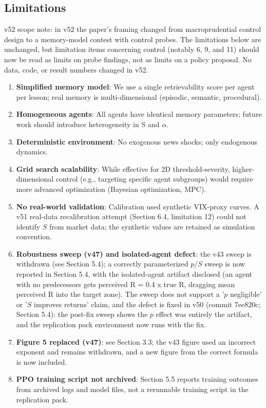 \documentclass[11pt]{article}
\begin{document}
\subsection{Limitations}
v52 scope note: in v52 the paper's framing changed from macroprudential control design to a memory-model contest with control probes. The limitations below are unchanged, but limitation items concerning control (notably 6, 9, and 11) should now be read as limits on probe findings, not as limits on a policy proposal. No data, code, or result numbers changed in v52.

\begin{enumerate}
\item \textbf{Simplified memory model}: We use a single retrievability score per agent per lesson; real memory is multi-dimensional (episodic, semantic, procedural).
\item \textbf{Homogeneous agents}: All agents have identical memory parameters; future work should introduce heterogeneity in S and $\alpha$.
\item \textbf{Deterministic environment}: No exogenous news shocks; only endogenous dynamics.
\item \textbf{Grid search scalability}: While effective for 2D threshold-severity, higher-dimensional control (e.g., targeting specific agent subgroups) would require more advanced optimization (Bayesian optimization, MPC).
\item \textbf{No real-world validation}: Calibration used synthetic VIX-proxy curves. A v51 real-data recalibration attempt (Section 6.4, limitation 12) could not identify $S$ from market data; the synthetic values are retained as simulation convention.
\item \textbf{Robustness sweep (v47) and isolated-agent defect}: the v43 sweep is withdrawn (see Section 5.4); a correctly parameterized $p$/$S$ sweep is now reported in Section 5.4, with the isolated-agent artifact disclosed (an agent with no predecessors gets perceived R = 0.4 x true R, dragging mean perceived R into the target zone). The sweep does not support a '$p$ negligible' or '$S$ improves returns' claim, and the defect is fixed in v50 (commit 7ee820c; Section 5.4): the post-fix sweep shows the $p$ effect was entirely the artifact, and the replication pack environment now runs with the fix.
\item \textbf{Figure 5 replaced (v47)}: see Section 3.3; the v43 figure used an incorrect exponent and remains withdrawn, and a new figure from the correct formula is now included.
\item \textbf{PPO training script not archived}: Section 5.5 reports training outcomes from archived logs and model files, not a rerunnable training script in the replication pack.

\end{enumerate}
\end{document}
